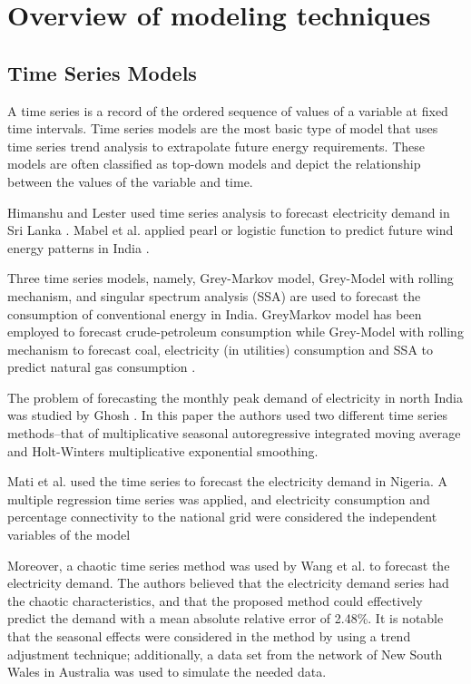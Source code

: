 \documentclass[lettersize,journal]{IEEEtran}
\begin{document}
\section{Overview of modeling techniques}

  \subsection{Time Series Models}

  A time series is a record of the ordered sequence of values of a variable at fixed time intervals. Time series models are the most basic type of model that uses time series trend analysis to extrapolate future energy requirements. These models are often classified as top-down models and depict the relationship between the values of the variable and time.

  Himanshu and Lester used time series analysis to forecast electricity demand in Sri Lanka \cite{srilanka}. Mabel et al. applied pearl or logistic function to predict future wind energy patterns in India \cite{TSA-india}.

Three time series models, namely, Grey-Markov model, Grey-Model with rolling mechanism, and singular spectrum analysis (SSA) are used to forecast the consumption of conventional energy in India. GreyMarkov model has been employed to forecast crude-petroleum consumption while Grey-Model with rolling mechanism to forecast coal, electricity (in utilities) consumption and SSA to predict natural gas consumption \cite{time-serie india}.

The problem of forecasting the monthly peak demand of electricity in north India was studied by Ghosh \cite{time-serie india ghosh}. In this paper the authors used two different time series methods–that of multiplicative seasonal autoregressive integrated moving average and Holt-Winters multiplicative exponential smoothing. 

Mati et al. \cite{time-serie Nigeria}used the time series to forecast the electricity demand in Nigeria. A multiple regression time series was applied, and electricity consumption and percentage connectivity to the national grid were considered the independent variables of the model

Moreover, a chaotic time series method was used by Wang et al. \cite{time-serie china}to forecast the electricity demand. The authors believed that the electricity demand series had the chaotic characteristics, and that the proposed method could effectively predict the demand with a mean absolute relative error of 2.48\%. It is notable that the seasonal effects were considered in the method by using a trend adjustment technique; additionally, a data set from the network of New South Wales in Australia was used to simulate the needed data.
\end{document}
